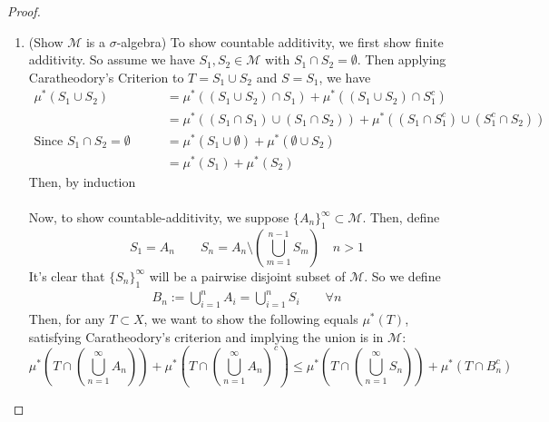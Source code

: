 \documentclass[12pt]{article}
\theoremstyle{plain}
\theoremstyle{definition}
\theoremstyle{remark}
\begin{document}
\begin{proof}
\begin{enumerate}
\item 
(Show $\mathscr{M}$ is a $\sigma$-algebra) To show countable additivity, we first show finite additivity. So assume we have $S_1, S_2\in\mathscr{M}$ with $S_1\cap S_2=\emptyset$. Then applying Caratheodory's Criterion to $T=S_1\cup S_2$ and $S=S_1$, we have
\begin{align*}
    \mu^*(S_1\cup S_2) &= \mu^*( (S_1\cup S_2) \cap S_1)
        + \mu^*( (S_1\cup S_2) \cap S^c_1) \\
    &= \mu^*( (S_1\cap S_1)\cup (S_1\cap S_2) )
        + \mu^*( (S_1 \cap S^c_1) \cup (S^c_1\cap S_2))\\
    \text{Since $S_1\cap S_2=\emptyset$} \qquad 
        &= \mu^*( S_1\cup \emptyset )
        + \mu^*( \emptyset \cup S_2)\\
        &= \mu^*(S_1)+ \mu^*(S_2)
\end{align*}
Then, by induction
\\
\\
Now, to show countable-additivity, we suppose $\{A_n\}_1^\infty \subset \mathscr{M}$.  Then, define 
\[
    S_1 = A_n \qquad 
    S_n = A_n \setminus 
    \left(\bigcup^{n-1}_{m=1} S_{m}\right)
    \quad \text{$n>1$}
\]
It's clear that $\{S_n\}_{1}^\infty$ will be a pairwise disjoint subset of $\mathscr{M}$. So we define
\begin{align*}
    B_n := \bigcup^n_{i=1} A_i = \bigcup^n_{i=1} S_i
    \qquad \forall n
\end{align*}
Then, for any $T\subset X$, we want to show the following equals $\mu^*(T)$, satisfying Caratheodory's criterion and implying the union is in $\mathscr{M}$:
\[
    \mu^*\left(T \cap \left(\bigcup^\infty_{n=1} A_n
    \right)\right) + 
    \mu^*\left(T \cap \left(\bigcup^\infty_{n=1} A_n
    \right)^c\right) 
    \leq 
    \mu^*\left(T \cap \left(\bigcup^\infty_{n=1} S_n
    \right)\right) + 
    \mu^*(T \cap B_n^c)
\]



\end{enumerate}

\end{proof}
\end{document}
